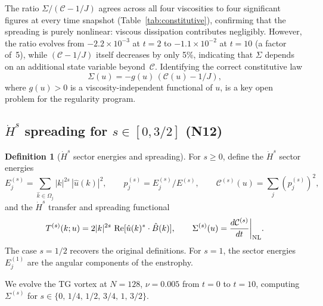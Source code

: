 \documentclass[11pt]{article}
\theoremstyle{definition}
\newtheorem{definition}[theorem]{Definition}
\newcommand{\Hdot}[1]{\dot{H}^{#1}}
\newcommand{\cC}{\mathcal{C}}
\DeclareMathOperator{\re}{Re}
\begin{document}
The ratio $\Sigma/(\cC-1/J)$ agrees across all four
viscosities to four significant figures at every time
snapshot (Table~\ref{tab:constitutive}), confirming
that the spreading is purely nonlinear: viscous
dissipation contributes negligibly.  However, the ratio
evolves from $-2.2\times 10^{-3}$ at $t=2$ to
$-1.1\times 10^{-2}$ at $t=10$ (a factor of~5), while
$(\cC-1/J)$ itself decreases by only 5\%, indicating
that $\Sigma$ depends on an additional state variable
beyond~$\cC$.  Identifying the correct constitutive law
\begin{equation}\label{eq:constitutive}
\Sigma(u) = -g(u)\,(\cC(u)-1/J),
\end{equation}
where $g(u)>0$ is a viscosity-independent functional
of $u$, is a key open problem for the regularity
program.


\subsection{$\Hdot{s}$ spreading for $s\in[0,3/2]$ (N12)}
\label{sec:Hs-spreading}

\begin{definition}[$\Hdot{s}$ sector energies and spreading]
\label{def:Hs-spreading}
For $s\geq 0$, define the $\Hdot{s}$ sector energies
\begin{equation}
E_j^{(s)} = \sum_{\hat k\in\Omega_j}
|k|^{2s}\,|\hat u(k)|^2,
\qquad p_j^{(s)} = E_j^{(s)}/E^{(s)},
\qquad \cC^{(s)}(u) = \sum_j (p_j^{(s)})^2,
\end{equation}
and the $\Hdot{s}$ transfer and spreading functional
\begin{equation}
T^{(s)}(k;u) = 2|k|^{2s}\,\re[\hat u(k)^*\cdot
\hat B(k)],
\qquad
\Sigma^{(s)}(u) = \frac{d\cC^{(s)}}{dt}
\bigg|_{\rm NL}.
\end{equation}
The case $s=1/2$ recovers the original definitions.
For $s=1$, the sector energies $E_j^{(1)}$ are the
angular components of the enstrophy.
\end{definition}

We evolve the TG vortex at $N=128$, $\nu=0.005$
from $t=0$ to $t=10$, computing $\Sigma^{(s)}$ for
$s\in\{0,\,1/4,\,1/2,\,3/4,\,1,\,3/2\}$.
\end{document}
